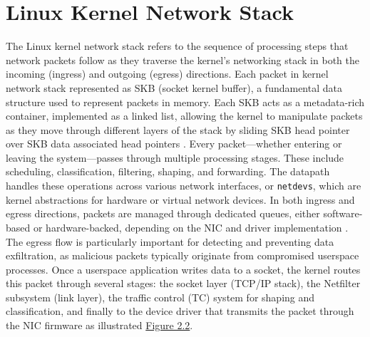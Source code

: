 \documentclass [11pt, proquest] {uwthesis}[2020/02/24]
\begin{document}
\section{Linux Kernel Network Stack}
The Linux kernel network stack refers to the sequence of processing steps that network packets follow as they traverse the kernel’s networking stack in both the incoming (ingress) and outgoing (egress) directions. Each packet in kernel network stack represented as SKB (socket kernel buffer), a fundamental data structure used to represent packets in memory. Each SKB acts as a metadata-rich container, implemented as a linked list, allowing the kernel to manipulate packets as they move through different layers of the stack by sliding SKB head pointer over SKB data associated head pointers . Every packet—whether entering or leaving the system—passes through multiple processing stages. These include scheduling, classification, filtering, shaping, and forwarding. The datapath handles these operations across various network interfaces, or \texttt{netdevs}, which are kernel abstractions for hardware or virtual network devices. In both ingress and egress directions, packets are managed through dedicated queues, either software-based or hardware-backed, depending on the NIC and driver implementation \cite{stephan2024path}. The egress flow is particularly important for detecting and preventing data exfiltration, as malicious packets typically originate from compromised userspace processes. Once a userspace application writes data to a socket, the kernel routes this packet through several stages: the socket layer (TCP/IP stack), the Netfilter subsystem (link layer), the traffic control (TC) system for shaping and classification, and finally to the device driver that transmits the packet through the NIC firmware as illustrated \hyperref[sec:kernel-network-datapath]{Figure 2.2}.

\end{document}
